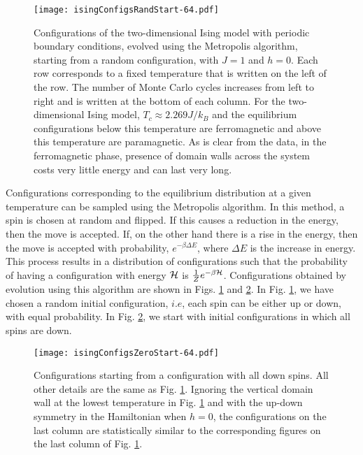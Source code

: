 \documentclass[a4paper,12pt]{article}
\begin{document}
\begin{figure}
  \centering
  \vspace{-1cm}
  \texttt{[image: isingConfigsRandStart-64.pdf]}
  \caption{Configurations of the two-dimensional Ising model with periodic boundary conditions,
    evolved using the Metropolis algorithm,
    starting from a random configuration,
    with $J=1$ and $h=0$.
    Each row corresponds to a fixed temperature that is written on the left of the row.
    The number of Monte Carlo cycles increases from left to right and is written at the bottom of
    each column.
    For the two-dimensional Ising model, $T_c\approx2.269J/k_B$ and the
    equilibrium configurations below this temperature are ferromagnetic and
    above this temperature are paramagnetic.
    As is clear from the data, in the ferromagnetic phase,
    presence of domain walls across the system costs very little
    energy and can last very long.
  }
  \label{isingConfRand}
\end{figure}

Configurations corresponding to the equilibrium distribution at a given
temperature can be sampled using the Metropolis algorithm.\cite{metropolis}
In this method, a spin is chosen at random and flipped. If this causes
a reduction in the energy, then the move is accepted. If, on the other
hand there is a rise in the energy, then the move is accepted with
probability, $e^{-\beta\Delta E}$, where $\Delta E$ is the increase in energy.
This process results in a distribution of configurations such that the
probability of having a configuration with energy $\cal H$ is
$\frac{1}{Z}e^{-\beta{\cal H}}$.
Configurations obtained by evolution using this algorithm are shown
in Figs. \ref{isingConfRand} and \ref{isingConfZero}.
In Fig. \ref{isingConfRand}, we have chosen a random initial configuration, $i.e$,
each spin can be either up or down, with equal probability.
In Fig. \ref{isingConfZero}, we start with initial configurations
in which all spins are down.

\begin{figure}
  \centering
  \texttt{[image: isingConfigsZeroStart-64.pdf]}
  \caption{Configurations starting from a configuration with all down spins.
    All other details are the same as Fig. \ref{isingConfRand}.
    Ignoring the vertical domain wall at the lowest temperature in
    Fig. \ref{isingConfRand} and with the up-down symmetry in the Hamiltonian when $h=0$,
    the configurations on the last column are statistically similar to the corresponding
    figures on the last column of Fig. \ref{isingConfRand}.
  }
  \label{isingConfZero}
\end{figure}
\end{document}
